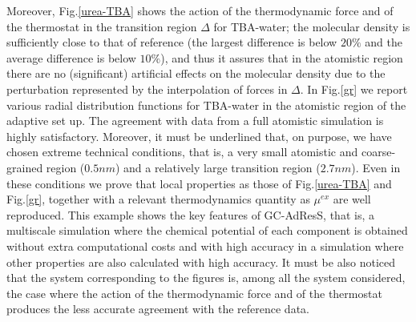 \documentclass[a4paper,preprint,unsortedaddress]{revtex4-1}
\begin{document}
Moreover, Fig.\ref{urea-TBA} shows the action of the thermodynamic force and of the thermostat in the transition region $\Delta$ for TBA-water; the molecular density is sufficiently close to that of reference (the largest difference is below $20\%$ and the average difference is below $10\%$), and thus it assures that in the atomistic region there are no (significant) artificial effects on the molecular density due to the perturbation represented by the interpolation of forces in $\Delta$. In Fig.\ref{gr} we report various radial distribution functions for TBA-water in the atomistic region of the adaptive set up. The agreement with data from a full atomistic simulation is highly satisfactory. Moreover, it must be underlined that, on purpose, we have chosen extreme technical conditions, that is, a very small atomistic and coarse-grained region ($0.5 nm$) and a relatively large transition region ($2.7 nm$). Even in these conditions we prove that local properties as those of Fig.\ref{urea-TBA} and Fig.\ref{gr}, together with a relevant thermodynamics quantity as $\mu^{ex}$ are well reproduced.
This example shows the key features of GC-AdResS, that is, a multiscale simulation where the chemical potential of each component is obtained without extra computational costs and with high accuracy in a simulation where other properties are also calculated with high accuracy. It must be also noticed that the system corresponding to the figures is, among all the system considered, the case where the action of the thermodynamic force and of the thermostat produces the less accurate agreement with the reference data.
\end{document}
